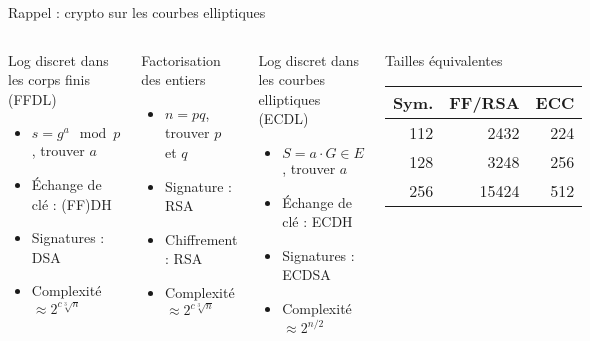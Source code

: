 \documentclass{mpg-ep-slides}
\begin{document}
\begin{frame}{Rappel : crypto sur les courbes elliptiques}
  \begin{columns}
    \begin{block}{Log discret dans les corps finis (FFDL) \strut}
      \begin{itemize}
        \item $s = g^a \mod p$, trouver $a$
        \item Échange de clé : (FF)DH
        \item Signatures : DSA
        \item Complexité $\approx 2^{c \sqrt[3]{n}}$
      \end{itemize}
    \end{block}

    \begin{block}{Factorisation des entiers}
      \begin{itemize}
        \item $n = pq$, trouver $p$ et $q$
        \item Signature : RSA
        \item Chiffrement : RSA
        \item Complexité $\approx 2^{c \sqrt[3]{n}}$
      \end{itemize}
    \end{block}

    \begin{block}{Log discret dans les courbes elliptiques (ECDL) \strut}
      \begin{itemize}
        \item $S = a \cdot G \in E$, trouver $a$
        \item Échange de clé : ECDH
        \item Signatures : ECDSA
        \item Complexité $\approx 2^{n / 2}$
      \end{itemize}
    \end{block}

    \begin{block}{Tailles équivalentes}
      \begin{tabular}{rrr}
        \toprule
        Sym. & FF/RSA & ECC \\
        \midrule
        112 &  2432 & 224 \\
        128 &  3248 & 256 \\
        256 & 15424 & 512 \\
        \bottomrule
      \end{tabular}
    \end{block}
  \end{columns}
\end{frame}
\end{document}
